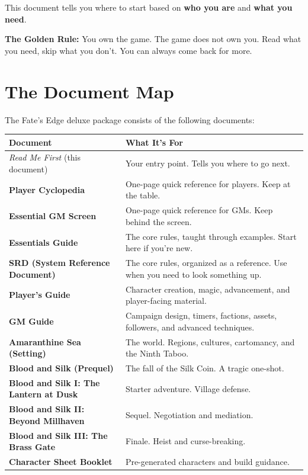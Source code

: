 \documentclass[10pt]{article}
\begin{document}
This document tells you where to start based on \textbf{who you are} and \textbf{what you need}.

\vspace{0.5cm}
\begin{tipbox}
\textbf{The Golden Rule:} You own the game. The game does not own you. Read what you need, skip what you don't. You can always come back for more.
\end{tipbox}

\newpage

\section*{The Document Map}

The Fate's Edge deluxe package consists of the following documents:

\vspace{0.3cm}
\begin{center}
\begin{tabular}{|p{3.5cm}|p{8cm}|}
\hline
\textbf{Document} & \textbf{What It's For} \\
\hline
\textit{Read Me First} (this document) & Your entry point. Tells you where to go next. \\
\hline
\textbf{Player Cyclopedia} & One-page quick reference for players. Keep at the table. \\
\hline
\textbf{Essential GM Screen} & One-page quick reference for GMs. Keep behind the screen. \\
\hline
\textbf{Essentials Guide} & The core rules, taught through examples. Start here if you're new. \\
\hline
\textbf{SRD (System Reference Document)} & The core rules, organized as a reference. Use when you need to look something up. \\
\hline
\textbf{Player's Guide} & Character creation, magic, advancement, and player-facing material. \\
\hline
\textbf{GM Guide} & Campaign design, timers, factions, assets, followers, and advanced techniques. \\
\hline
\textbf{Amaranthine Sea (Setting)} & The world. Regions, cultures, cartomancy, and the Ninth Taboo. \\
\hline
\textbf{Blood and Silk (Prequel)} & The fall of the Silk Coin. A tragic one-shot. \\
\hline
\textbf{Blood and Silk I: The Lantern at Dusk} & Starter adventure. Village defense. \\
\hline
\textbf{Blood and Silk II: Beyond Millhaven} & Sequel. Negotiation and mediation. \\
\hline
\textbf{Blood and Silk III: The Brass Gate} & Finale. Heist and curse-breaking. \\
\hline
\textbf{Character Sheet Booklet} & Pre-generated characters and build guidance. \\
\hline
\end{tabular}
\end{center}
\end{document}
